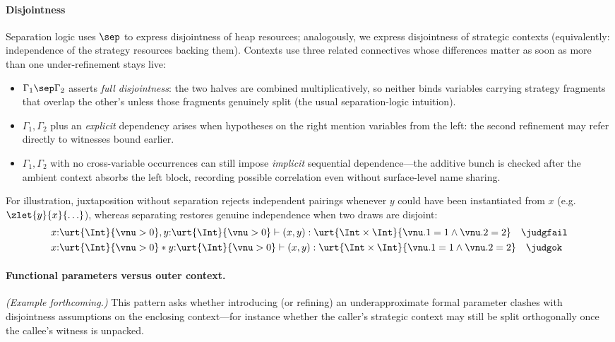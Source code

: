 \paragraph{Disjointness} Separation logic uses $\sep$ to express disjointness of heap resources; analogously, we express disjointness of strategic contexts (equivalently: independence of the strategy resources backing them).
Contexts use three related connectives whose differences matter as soon as more than one under-refinement stays live:
\begin{itemize}
\item \(\Gamma_1 \sep \Gamma_2\) asserts \emph{full disjointness}: the two halves are combined multiplicatively, so neither binds variables carrying strategy fragments that overlap the other's unless those fragments genuinely split (the usual separation-logic intuition).
\item \(\Gamma_1 , \Gamma_2\) plus an \emph{explicit} dependency arises when hypotheses on the right mention variables from the left: the second refinement may refer directly to witnesses bound earlier.
\item \(\Gamma_1 , \Gamma_2\) with no cross-variable occurrences can still impose \emph{implicit} sequential dependence---the additive bunch is checked after the ambient context absorbs the left block, recording possible correlation even without surface-level name sharing.
\end{itemize}
\noindent
For illustration, juxtaposition without separation rejects independent pairings whenever \(y\) could have been instantiated from \(x\) (e.g.\ \(\zlet{y}{x}{\ldots}\)), whereas separating restores genuine independence when two draws are disjoint:
\begin{align*}
  &x{:}\urt{\Int}{\vnu > 0}, y{:}\urt{\Int}{\vnu > 0} \vdash (x, y) : \urt{\Int \times \Int}{\vnu.1 = 1 \land \vnu.2 = 2} \quad \judgfail
  \\&x{:}\urt{\Int}{\vnu > 0} * y{:}\urt{\Int}{\vnu > 0} \vdash (x, y) : \urt{\Int \times \Int}{\vnu.1 = 1 \land \vnu.2 = 2} \quad \judgok
\end{align*}

\paragraph{Functional parameters versus outer context.}
\emph{(Example forthcoming.)}
This pattern asks whether introducing (or refining) an underapproximate formal parameter clashes with disjointness assumptions on the enclosing context---for instance whether the caller's strategic context may still be split orthogonally once the callee's witness is unpacked.


